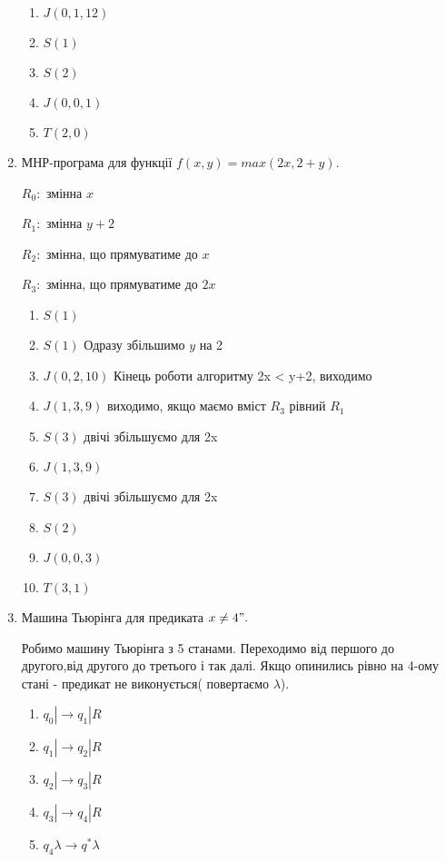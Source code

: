 \documentclass[a4paper, 12pt]{article}
\begin{document}
\begin{enumerate}
{\begin{test-answer-long}
\begin{enumerate}[1.]
\item{$J(0,1,12)$}
\item{$S(1)$}
\item{$S(2)$}
\item{$J(0,0,1)$}
\item{$T(2,0)$}


\end{enumerate}
\end{test-answer-long}
\newpage
}
 

\item{МНР-програма для функції  $f(x, y) = max(2x, 2+y).$\par
\begin{test-answer-long}

$R_0:$ змінна $x$\par
$R_1:$ змінна $y+2$\par
$R_2:$ змінна, що прямуватиме до $x$\par
$R_3:$ змінна, що прямуватиме до $2x$
\begin{enumerate}[1.]
\item{$S(1)$}
\item{$S(1)$ Одразу збільшимо $y$ на 2}
\item{$J(0,2,10)$ Кінець роботи алгоритму 2x < y+2, виходимо} 
\item{$J(1,3,9)$ виходимо, якщо маємо вміст $R_3$ рівний $R_1$}
\item{$S(3)$ двічі збільшуємо для 2x}
\item{$J(1,3,9)$}
\item{$S(3)$ двічі збільшуємо для 2x}
\item{$S(2)$}
\item{$J(0,0,3)$}
\item{$T(3,1)$}
\end{enumerate}
\end{test-answer-long}
\newpage
}
\item{Машина Тьюрінга для предиката $x\neq4".$  
\begin{test-answer-long}
Робимо машину Тьюрінга з 5 станами. Переходимо від першого до другого,від другого до третього і так далі. Якщо опинились рівно на 4-ому стані - предикат не виконується( повертаємо $\lambda$).

\begin{enumerate}[]
\item{$q_0| \rightarrow q_1|R$}
\item{$q_1| \rightarrow q_2|R$}
\item{$q_2| \rightarrow q_3|R$}
\item{$q_3| \rightarrow q_4|R$}
\item{$q_4\lambda \rightarrow q^{*}\lambda$

}
\end{enumerate}
\end{test-answer-long}}
\end{enumerate}
\end{document}
